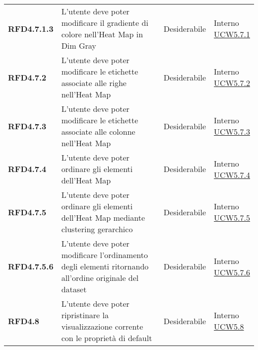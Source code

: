 \begin{longtable}[H]{| >{\raggedright\bfseries}m{20mm} | >{\raggedright}m{90mm} | >{\centering}m{25mm} | >{\centering\arraybackslash}m{30mm}|}
    RFD4.7.1.3
     & L'utente deve poter modificare il gradiente di colore nell'Heat Map in Dim Gray
     & Desiderabile
     & \makecell{ Interno                                                                                                \\  \hyperref[par:ucw5.7.1]{UCW5.7.1} }\\

    RFD4.7.2
     & L'utente deve poter modificare le etichette associate alle righe nell'Heat Map
     & Desiderabile
     & \makecell{ Interno                                                                                                \\  \hyperref[par:ucw5.7.2]{UCW5.7.2} }\\

    RFD4.7.3
     & L'utente deve poter modificare le etichette associate alle colonne nell'Heat Map
     & Desiderabile
     & \makecell{ Interno                                                                                                \\  \hyperref[par:ucw5.7.3]{UCW5.7.3} }\\

    RFD4.7.4
     & L'utente deve poter ordinare gli elementi dell'Heat Map
     & Desiderabile
     & \makecell{ Interno                                                                                                \\  \hyperref[par:ucw5.7.4]{UCW5.7.4} }\\

    RFD4.7.5
     & L'utente deve poter ordinare gli elementi dell'Heat Map mediante clustering gerarchico
     & Desiderabile
     & \makecell{ Interno                                                                                                \\  \hyperref[spar:ucw5.7.5]{UCW5.7.5} }\\

    RFD4.7.5.6
     & L'utente deve poter modificare l'ordinamento degli elementi ritornando all'ordine originale del dataset
     & Desiderabile
     & \makecell{ Interno                                                                                                \\  \hyperref[spar:ucw5.7.6]{UCW5.7.6} }\\

    RFD4.8
     & L'utente deve poter ripristinare la visualizzazione corrente con le proprietà di default
     & Desiderabile
     & \makecell{ Interno                                                                                                \\  \hyperref[ssub:ucw5.8]{UCW5.8} }\\


\end{longtable}
